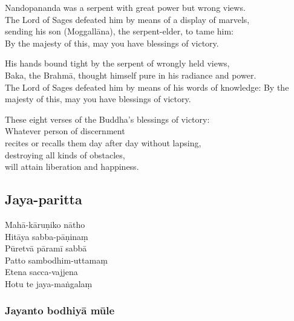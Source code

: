 Nandopananda was a serpent with great power but wrong views.\\
The Lord of Sages defeated him by means of a display of marvels,\\
sending his son (Moggallāna), the serpent-elder, to tame him:\\
By the majesty of this, may you have blessings of victory.

His hands bound tight by the serpent of wrongly held views,\\
Baka, the Brahmā, thought himself pure in his radiance and power.\\
The Lord of Sages defeated him by means of his words of knowledge:
By the majesty of this, may you have blessings of victory.

These eight verses of the Buddha's blessings of victory:\\
Whatever person of discernment\\
recites or recalls them day after day without lapsing,\\
destroying all kinds of obstacles,\\
will attain liberation and happiness.

\subsection{Jaya-paritta}
\label{maha-karuniko}


\begin{paritta}
  Mahā-kāruṇiko nātho\\
  Hitāya sabba-pāṇinaṃ\\
  Pūretvā pāramī sabbā\\
  Patto sambodhim-uttamaṃ\\
  Etena sacca-vajjena\\
  Hotu te jaya-maṅgalaṃ
\end{paritta}

\clearpage

\subsubsection{Jayanto bodhiyā mūle}



\bigskip

